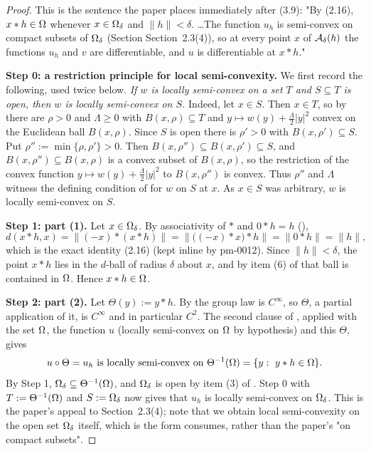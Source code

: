 \begin{proof}
This is the sentence the paper places immediately after (3.9): "By (2.16), $x*h\in\Omega$
whenever $x\in\Omega_\delta$ and $\|h\|<\delta$. \dots The function $u_h$ is semi-convex on
compact subsets of $\Omega_\delta$ (Section Section~2.3(4)), so at every point $x$ of
$\mathcal{A}_\delta(h)$ the functions $u_h$ and $v$ are differentiable, and $u$ is differentiable at
$x*h$."

\medskip\noindent\textbf{Step 0: a restriction principle for local semi-convexity.} We first
record the following, used twice below. \emph{If $w$ is locally semi-convex on a set $T$ and
$S\subseteq T$ is open, then $w$ is locally semi-convex on $S$.} Indeed, let $x\in S$. Then
$x\in T$, so by  there are $\rho>0$ and $\Lambda\ge0$ with
$B(x,\rho)\subseteq T$ and $y\mapsto w(y)+\frac\Lambda2|y|^{2}$ convex on the Euclidean ball
$B(x,\rho)$. Since $S$ is open there is $\rho'>0$ with $B(x,\rho')\subseteq S$. Put
$\rho'':=\min\{\rho,\rho'\}>0$. Then $B(x,\rho'')\subseteq B(x,\rho')\subseteq S$, and
$B(x,\rho'')\subseteq B(x,\rho)$ is a convex subset of $B(x,\rho)$, so the restriction of the
convex function $y\mapsto w(y)+\frac\Lambda2|y|^{2}$ to $B(x,\rho'')$ is convex. Thus
$\rho''$ and $\Lambda$ witness the defining condition of  for
$w$ on $S$ at $x$. As $x\in S$ was arbitrary, $w$ is locally semi-convex on $S$.

\medskip\noindent\textbf{Step 1: part (1).} Let $x\in\Omega_\delta$. By associativity of $*$ and
$0*h=h$ (),
\[
 d(x*h,x)=\big\|(-x)*(x*h)\big\|=\big\|\big((-x)*x\big)*h\big\|=\|0*h\|=\|h\| ,
\]
which is the exact identity (2.16) (kept inline by pm-0012). Since $\|h\|<\delta$,
the point $x*h$ lies in the $d$-ball of radius $\delta$ about $x$, and by item (6) of
 that ball is contained in $\Omega$. Hence $x*h\in\Omega$.

\medskip\noindent\textbf{Step 2: part (2).} Let $\Theta(y):=y*h$. By
 the group law is $C^{\infty}$, so $\Theta$, a partial application of
it, is $C^{\infty}$ and in particular $C^{2}$. The second clause of
, applied with the set $\Omega$, the function $u$ (locally
semi-convex on $\Omega$ by hypothesis) and this $\Theta$, gives
\[
 u\circ\Theta=u_h\ \text{is locally semi-convex on}\ \Theta^{-1}(\Omega)=\{y:\ y*h\in\Omega\} .
\]
By Step 1, $\Omega_\delta\subseteq\Theta^{-1}(\Omega)$, and $\Omega_\delta$ is open by item (3) of
. Step 0 with $T:=\Theta^{-1}(\Omega)$ and $S:=\Omega_\delta$ now
gives that $u_h$ is locally semi-convex on $\Omega_\delta$. This is the paper's appeal to
Section~2.3(4); note that we obtain local semi-convexity on the open set $\Omega_\delta$
itself, which is the form  consumes, rather than the paper's
"on compact subsets".


\end{proof}
